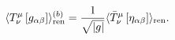 \begin{equation}
\langle T_{\nu }^{\mu }\left[ g_{\alpha \beta }\right] \rangle _{{\rm ren}%
}^{(b)}=\frac{1}{\sqrt{|g|}}\langle \bar{T}_{\nu }^{\mu }\left[
\eta _{\alpha \beta }\right] \rangle _{{\rm ren}}.
\label{translaw}
\end{equation}

